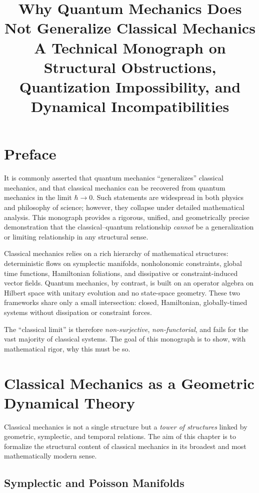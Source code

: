 \documentclass[12pt,oneside]{book}
\title{\Huge{\textbf{Why Quantum Mechanics Does Not Generalize Classical Mechanics}}\\[1em]
\Large{A Technical Monograph on Structural Obstructions,\\
Quantization Impossibility, and Dynamical Incompatibilities}}
\author{}
\date{}
\begin{document}
\maketitle
\tableofcontents

\chapter*{Preface}

It is commonly asserted that quantum mechanics ``generalizes'' classical mechanics,
and that classical mechanics can be recovered from quantum mechanics in the limit $\hbar\to 0$.
Such statements are widespread in both physics and philosophy of science; however,
they collapse under detailed mathematical analysis.
This monograph provides a rigorous, unified, and geometrically precise demonstration
that the classical--quantum relationship \emph{cannot} be a generalization or limiting relationship
in any structural sense.

Classical mechanics relies on a rich hierarchy of mathematical structures:
deterministic flows on symplectic manifolds, nonholonomic constraints,
global time functions, Hamiltonian foliations, and dissipative or constraint-induced vector fields.
Quantum mechanics, by contrast, is built on an operator algebra on Hilbert space with unitary evolution and no state-space geometry.
These two frameworks share only a small intersection: closed, Hamiltonian,
globally-timed systems without dissipation or constraint forces.

The ``classical limit'' is therefore \emph{non-surjective}, \emph{non-functorial},
and fails for the vast majority of classical systems.
The goal of this monograph is to show, with mathematical rigor, why this must be so.

\chapter{Classical Mechanics as a Geometric Dynamical Theory}

Classical mechanics is not a single structure but a \emph{tower of structures}
linked by geometric, symplectic, and temporal relations.  
The aim of this chapter is to formalize the structural content of classical mechanics
in its broadest and most mathematically modern sense.

\section{Symplectic and Poisson Manifolds}
\end{document}
